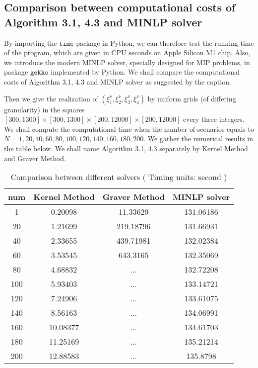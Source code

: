 \documentclass{article}
\theoremstyle{plain}
\theoremstyle{definition}
\begin{document}
\begin{propsition}
\subsection{Comparison between computational costs of Algorithm 3.1, 4.3 and MINLP solver}
By importing the $\texttt{time}$ package in Python,  we can therefore test the running time of the program, which are given in CPU seconds on Apple Silicon M1 chip. Also, we introduce the modern MINLP solver, specially designed for MIP problems, in package $\texttt{gekko}$ implemented by Python. We shall compare the computational costs of Algorithm 3.1, 4.3 and MINLP solver as suggested by the caption.

Then we give the realization of $\left(\xi_{1}^{\nu}, \xi_{2}^{\nu}, \xi_{3}^{\nu}, \xi_{4}^{\nu}\right)$   by uniform grids (of differing granularity) in the squares $ [300,1300] \times [300,1300]\times [200,12000] \times[200,12000]$ every three integers. We shall compute the computational time when the number of scenarios equals to $N=1,20,40,60,80	,100,120,140,160,180,200.$ We gather the numerical results in the table below. We shall name Algorithm 3.1, 4.3 separately by Kernel Method and Graver Method.

\begin{table}[htbp]
\centering
\caption{Comparison between different solvers ( Timing units: second )}
\begin{tabular}{|c|c|c|c|}
\hline
num  & Kernel Method & Graver Method & MINLP solver \\
\hline
1 & 0.20098  & 11.33629  & 131.06186   \\
20 & 1.21699  & 219.18796 & 131.66931   \\
40 & 2.33655  & 439.71981 & 132.02384   \\
60 & 3.53545  & 643.3165  & 132.35069   \\
80 & 4.68832  & ...       & 132.72208  \\
100 & 5.93403  & ...       & 133.14721   \\
120 & 7.24906  & ...       & 133.61075  \\
140 & 8.56163  & ...       & 134.06991  \\
160 & 10.08377 & ...       & 134.61703   \\
180 & 11.25169 & ...       & 135.21214  \\
200 & 12.88583 & ...       & 135.8798  \\
 \hline
\end{tabular}
\end{table}


\end{propsition}
\end{document}
